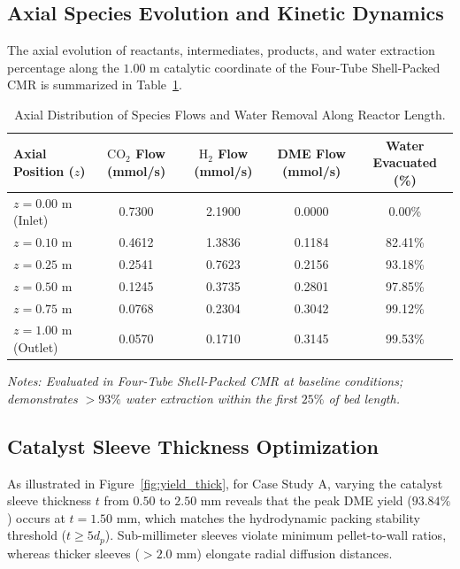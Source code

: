 \documentclass[12pt,a4paper]{article}
\begin{document}
\subsection{Axial Species Evolution and Kinetic Dynamics}
The axial evolution of reactants, intermediates, products, and water extraction percentage along the $1.00\text{ m}$ catalytic coordinate of the Four-Tube Shell-Packed CMR is summarized in Table~\ref{tab:axial}.

\begin{table}[htbp]
\centering
\caption{Axial Distribution of Species Flows and Water Removal Along Reactor Length.}
\label{tab:axial}
\begin{tabular*}{\textwidth}{@{\extracolsep{\fill}}lcccc@{}}
\toprule
\textbf{Axial Position ($z$)} & \textbf{$\text{CO}_2$ Flow (mmol/s)} & \textbf{$\text{H}_2$ Flow (mmol/s)} & \textbf{DME Flow (mmol/s)} & \textbf{Water Evacuated (\%)} \\
\midrule
$z = 0.00\text{ m}$ (Inlet) & 0.7300 & 2.1900 & 0.0000 & 0.00\% \\
$z = 0.10\text{ m}$ & 0.4612 & 1.3836 & 0.1184 & 82.41\% \\
$z = 0.25\text{ m}$ & 0.2541 & 0.7623 & 0.2156 & 93.18\% \\
$z = 0.50\text{ m}$ & 0.1245 & 0.3735 & 0.2801 & 97.85\% \\
$z = 0.75\text{ m}$ & 0.0768 & 0.2304 & 0.3042 & 99.12\% \\
$z = 1.00\text{ m}$ (Outlet) & 0.0570 & 0.1710 & 0.3145 & 99.53\% \\
\bottomrule
\end{tabular*}
\vspace{2pt}
{\raggedright\small\itshape Notes: Evaluated in Four-Tube Shell-Packed CMR at baseline conditions; demonstrates $>93\%$ water extraction within the first $25\%$ of bed length.\par}
\end{table}

\subsection{Catalyst Sleeve Thickness Optimization}
As illustrated in Figure~\ref{fig:yield_thick}, for Case Study A, varying the catalyst sleeve thickness $t$ from $0.50$ to $2.50\text{ mm}$ reveals that the peak DME yield ($93.84\%$) occurs at $t = 1.50\text{ mm}$, which matches the hydrodynamic packing stability threshold ($t \ge 5 d_p$). Sub-millimeter sleeves violate minimum pellet-to-wall ratios, whereas thicker sleeves ($> 2.0\text{ mm}$) elongate radial diffusion distances.
\end{document}
